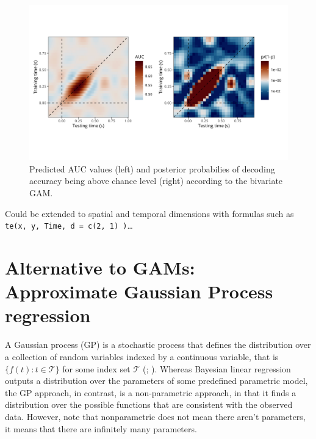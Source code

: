 \documentclass[
  doc,
  floatsintext,
  longtable,
  a4paper,
  nolmodern,
  notxfonts,
  notimes,
  colorlinks=true,linkcolor=blue,citecolor=blue,urlcolor=blue]{apa7}
\begin{document}
\begin{figure}[H]

\caption{Predicted AUC values (left) and posterior probabilies of
decoding accuracy being above chance level (right) according to the
bivariate GAM.}

{\centering \includegraphics[width=1\textwidth,height=\textheight]{brms_meeg_files/figure-pdf/gam-timegen-post-preds-1.png}

}

\end{figure}%

Could be extended to spatial and temporal dimensions with formulas such
as \texttt{te(x,\ y,\ Time,\ d\ =\ c(2,\ 1)\ )}\ldots{}

\newpage

\section{Alternative to GAMs: Approximate Gaussian Process
regression}\label{alternative-to-gams-approximate-gaussian-process-regression}

A Gaussian process (GP) is a stochastic process that defines the
distribution over a collection of random variables indexed by a
continuous variable, that is \(\{f(t): t \in \mathcal{T}\}\) for some
index set \(\mathcal{T}\) (;
). Whereas Bayesian linear regression outputs a distribution over
the parameters of some predefined parametric model, the GP approach, in
contrast, is a non-parametric approach, in that it finds a distribution
over the possible functions that are consistent with the observed data.
However, note that nonparametric does not mean there aren't parameters,
it means that there are infinitely many parameters.
\end{document}
